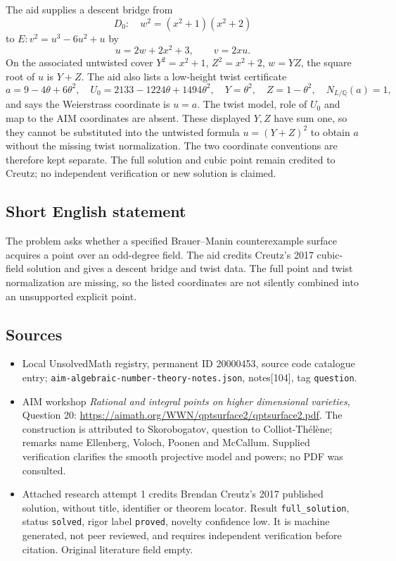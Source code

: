 \documentclass[11pt]{article}
\newcommand{\Q}{\mathbb{Q}}
\begin{document}
The aid supplies a descent bridge from
\[D_0:\quad w^2=(x^2+1)(x^2+2)\]
to $E:v^2=u^3-6u^2+u$ by
\[u=2w+2x^2+3,\qquad v=2xu.\]
On the associated untwisted cover $Y^2=x^2+1$, $Z^2=x^2+2$, $w=YZ$, the square root of $u$ is $Y+Z$. The aid also lists a low-height twist certificate
\[a=9-4\theta+6\theta^2,\quad U_0=2133-1224\theta+1494\theta^2,\quad Y=\theta^2,\quad Z=1-\theta^2,\quad N_{L/\Q}(a)=1,\]
and says the Weierstrass coordinate is $u=a$. The twist model, role of $U_0$ and map to the AIM coordinates are absent. These displayed $Y,Z$ have sum one, so they cannot be substituted into the untwisted formula $u=(Y+Z)^2$ to obtain $a$ without the missing twist normalization. The two coordinate conventions are therefore kept separate. The full solution and cubic point remain credited to Creutz; no independent verification or new solution is claimed.
\subsection{Short English statement}
The problem asks whether a specified Brauer--Manin counterexample surface acquires a point over an odd-degree field. The aid credits Creutz's 2017 cubic-field solution and gives a descent bridge and twist data. The full point and twist normalization are missing, so the listed coordinates are not silently combined into an unsupported explicit point.
\subsection{Sources}
\begin{itemize}
\item Local UnsolvedMath registry, permanent ID 20000453, source code catalogue entry; \texttt{aim-algebraic-number-theory-notes.json}, notes[104], tag \texttt{question}.
\item AIM workshop \emph{Rational and integral points on higher dimensional varieties}, Question 20: \url{https://aimath.org/WWN/qptsurface2/qptsurface2.pdf}. The construction is attributed to Skorobogatov, question to Colliot-Thélène; remarks name Ellenberg, Voloch, Poonen and McCallum. Supplied verification clarifies the smooth projective model and powers; no PDF was consulted.
\item Attached research attempt 1 credits Brendan Creutz's 2017 published solution, without title, identifier or theorem locator. Result \texttt{full\_solution}, status \texttt{solved}, rigor label \texttt{proved}, novelty confidence low. It is machine generated, not peer reviewed, and requires independent verification before citation. Original literature field empty.
\end{itemize}
\end{document}
